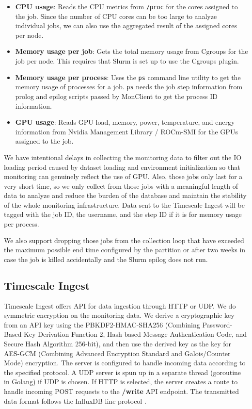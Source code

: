 \begin{itemize}
    \item \textbf{CPU usage}: Reads the CPU metrics from \texttt{/proc} for the cores assigned to the job. Since the number of CPU cores can be too large to analyze individual jobs, we can also use the aggregated result of the assigned cores per node.
    \item \textbf{Memory usage per job}: Gets the total memory usage from Cgroups for the job per node. This requires that Slurm is set up to use the Cgroups plugin.
    \item \textbf{Memory usage per process}: Uses the \texttt{ps} command line utility to get the memory usage of processes for a job. \texttt{ps} needs the job step information from prolog and epilog scripts passed by MonClient to get the process ID information.
    \item \textbf{GPU usage}: Reads GPU load, memory, power, temperature, and energy information from Nvidia Management Library / ROCm-SMI for the GPUs assigned to the job.
\end{itemize}

We have intentional delays in collecting the monitoring data to filter out the IO loading period caused by dataset loading and environment initialization so that monitoring can genuinely reflect the use of GPU. Also, those jobs only last for a very short time, so we only collect from those jobs with a meaningful length of data to analyze and reduce the burden of the database and maintain the stability of the whole monitoring infrastructure. Data sent to the Timescale Ingest will be tagged with the job ID, the username, and the step ID if it is for memory usage per process.

We also support dropping those jobs from the collection loop that have exceeded the maximum possible end time configured by the partition or after two weeks in case the job is killed accidentally and the Slurm epilog does not run.


\subsection{Timescale Ingest}

Timescale Ingest offers API for data ingestion through HTTP or UDP. We do symmetric encryption on the monitoring data. We derive a cryptographic key from an API key using the PBKDF2-HMAC-SHA256 (Combining Password-Based Key Derivation Function 2, Hash-based Message Authentication Code, and Secure Hash Algorithm 256-bit), and then use the derived key as the key for AES-GCM (Combining Advanced Encryption Standard and Galois/Counter Mode) encryption. The server is configured to handle incoming data according to the specified protocol. A UDP server is spun up in a separate thread (goroutine in Golang) if UDP is chosen. If HTTP is selected, the server creates a route to handle incoming POST requests to the \textbf{/write} API endpoint. The transmitted data format follows the InfluxDB line protocol \cite{influxlineprotocol}.

